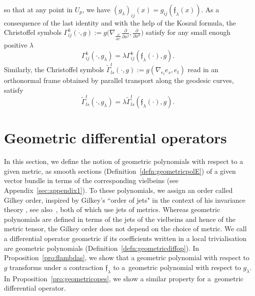 \documentclass[pdftex]{sigma}
\numberwithin{equation}{section}
\theoremstyle{definition}
\begin{document}
so that at any point in $U_p$, we have
$\left(g_\lambda\right)_{ij}(x)=g_{ij}(\mathfrak{f}_\lambda(x)).$ As a consequence of the last identity and with the help of the Koszul formula, the Christoffel symbols $\Gamma_{i j}^k (\cdot, g):=g\bigl(\nabla_{\frac{\partial}{\partial x^i}} \frac{\partial}{\partial x^j}, \frac{\partial}{\partial x^k}\bigr)$ satisfy for any small enough positive $\lambda$
\begin{equation*}
 \Gamma_{i j}^k (\cdot, g_\lambda) =\lambda \Gamma_{i j}^k (\mathfrak{f}_\lambda(\cdot),g).
 \end{equation*}
Similarly, the Christoffel symbols $\tilde\Gamma_{ls}^t(\cdot,g) :=g(\nabla_{e_l}e_s,e_t)$ read in an orthonormal frame obtained by parallel transport along the geodesic curves, satisfy
\begin{equation}\label{eq:symbchriglamdabis}
\tilde\Gamma_{ls}^t(\cdot,g_\lambda) =\lambda \tilde\Gamma_{ls}^t( \mathfrak{f}_\lambda(\cdot), g).
\end{equation}

\section{Geometric differential operators}
In this section, we define the notion of geometric polynomials with respect to a given metric, as smooth sections (Definition~\ref{defn:geometricpolE}) of a given vector bundle in terms of the corresponding vielbeins (see Appendix~\ref{sec:appendix1}). To these polynomials, we assign an order called Gilkey order, inspired by Gilkey's ``order of jets" in the context of his invariance theory \cite[Section~2.4]{G}, see also~\mbox{\cite[Section~3]{MP}}, both of which use jets of metrics. Whereas geometric polynomials are defined in terms of the jets of the vielbeins and hence of the metric tensor, the Gilkey order does not depend on the choice of metric. We call a differential operator geometric if its coefficients written in a local trivialisation are geometric polynomials (Definition~\ref{defn:geometricdiffop}). In Proposition~\ref{pro:flambdas}, we show that a geometric polynomial with respect to $g$ transforms under a contraction $\mathfrak f_\lambda$ to a~geometric polynomial with respect to $g_\lambda$. In Proposition~\ref{pro:geometricopes}, we show a similar property for a~geometric differential operator.
\end{document}

